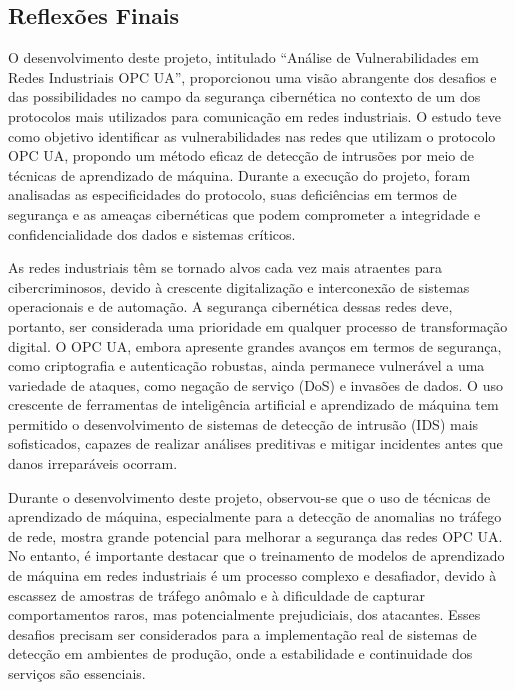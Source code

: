 \subsection{Reflexões Finais}

    O desenvolvimento deste projeto, intitulado ``Análise de Vulnerabilidades em Redes Industriais OPC UA'', proporcionou uma visão abrangente dos desafios e das possibilidades no campo da segurança cibernética no contexto de um dos protocolos mais utilizados para comunicação em redes industriais. O estudo teve como objetivo identificar as vulnerabilidades nas redes que utilizam o protocolo OPC UA, propondo um método eficaz de detecção de intrusões por meio de técnicas de aprendizado de máquina. Durante a execução do projeto, foram analisadas as especificidades do protocolo, suas deficiências em termos de segurança e as ameaças cibernéticas que podem comprometer a integridade e confidencialidade dos dados e sistemas críticos.

    As redes industriais têm se tornado alvos cada vez mais atraentes para cibercriminosos, devido à crescente digitalização e interconexão de sistemas operacionais e de automação. A segurança cibernética dessas redes deve, portanto, ser considerada uma prioridade em qualquer processo de transformação digital. O OPC UA, embora apresente grandes avanços em termos de segurança, como criptografia e autenticação robustas, ainda permanece vulnerável a uma variedade de ataques, como negação de serviço (DoS) e invasões de dados. O uso crescente de ferramentas de inteligência artificial e aprendizado de máquina tem permitido o desenvolvimento de sistemas de detecção de intrusão (IDS) mais sofisticados, capazes de realizar análises preditivas e mitigar incidentes antes que danos irreparáveis ocorram.

    Durante o desenvolvimento deste projeto, observou-se que o uso de técnicas de aprendizado de máquina, especialmente para a detecção de anomalias no tráfego de rede, mostra grande potencial para melhorar a segurança das redes OPC UA. No entanto, é importante destacar que o treinamento de modelos de aprendizado de máquina em redes industriais é um processo complexo e desafiador, devido à escassez de amostras de tráfego anômalo e à dificuldade de capturar comportamentos raros, mas potencialmente prejudiciais, dos atacantes. Esses desafios precisam ser considerados para a implementação real de sistemas de detecção em ambientes de produção, onde a estabilidade e continuidade dos serviços são essenciais.

